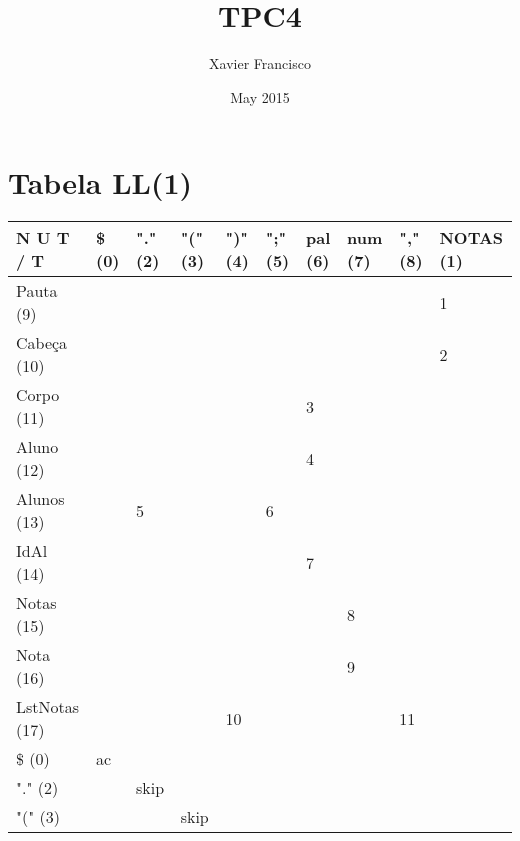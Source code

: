 \documentclass{article}
\title{TPC4}
\author{Xavier Francisco}
\date{May 2015}
\begin{document}
\maketitle

\section{Tabela LL(1)}

\begin{table}
    \begin{tabular}{|l|l|l|ll|l|l|l|l|l|}
    \hline
    N U T / T     & \$ (0) & "." (2) & "(" (3) & ")" (4) & ";" (5) & pal (6) & num (7) & "," (8) & NOTAS (1) \\ \hline
    Pauta (9)     & ~      & ~       & ~       & ~       & ~       & ~       & ~       & ~       & 1         \\ \hline
    Cabeça (10)   & ~      & ~       & ~       & ~       & ~       & ~       & ~       & ~       & 2         \\ \hline
    Corpo (11)    & ~      & ~       & ~       & ~       & ~       & 3       & ~       & ~       & ~         \\ \hline
    Aluno (12)    & ~      & ~       & ~       & ~       & ~       & 4       & ~       & ~       & ~         \\ \hline
    Alunos (13)   & ~      & 5       & ~       & ~       & 6       & ~       & ~       & ~       & ~         \\ \hline
    IdAl (14)     & ~      & ~       & ~       & ~       & ~       & 7       & ~       & ~       & ~         \\ \hline
    Notas (15)    & ~      & ~       & ~       & ~       & ~       & ~       & 8       & ~       & ~         \\ \hline
    Nota (16)     & ~      & ~       & ~       & ~       & ~       & ~       & 9       & ~       & ~         \\ \hline
    LstNotas (17) & ~      & ~       & ~       & 10      & ~       & ~       & ~       & 11      & ~         \\ \hline
    \$ (0)        & ac     & ~       & ~       & ~       & ~       & ~       & ~       & ~       & ~         \\ \hline \hline
    "." (2)       & ~      & skip    & ~       & ~       & ~       & ~       & ~       & ~       & ~         \\ \hline
    "(" (3)       & ~      & ~       & skip    & ~       & ~       & ~       & ~       & ~       & ~         \\ \hline

\end{tabular}
\end{table}
\end{document}
